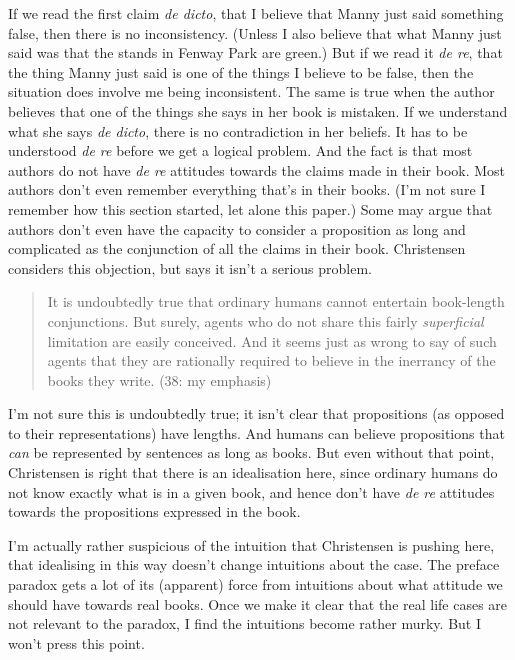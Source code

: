 \noindent If we read the first claim \textit{de dicto}, that I believe that Manny just said something false, then there is no inconsistency. (Unless I also believe that what Manny just said was that the stands in Fenway Park are green.) But if we read it \textit{de re}, that the thing Manny just said is one of the things I believe to be false, then the situation does involve me being inconsistent. The same is true when the author believes that one of the things she says in her book is mistaken. If we understand what she says \textit{de dicto}, there is no contradiction in her beliefs. It has to be understood \textit{de re} before we get a logical problem. And the fact is that most authors do not have \textit{de re} attitudes towards the claims made in their book. Most authors don't even remember everything that's in their books. (I'm not sure I remember how this section started, let alone this paper.) Some may argue that authors don't even have the capacity to consider a proposition as long and complicated as the conjunction of all the claims in their book. Christensen considers this objection, but says it isn't a serious problem.

\begin{quote}
It is undoubtedly true that ordinary humans cannot entertain book-length conjunctions. But surely, agents who do not share this fairly \textit{superficial} limitation are easily conceived. And it seems just as wrong to say of such agents that they are rationally required to believe in the inerrancy of the books they write. (38: my emphasis)
\end{quote}

\noindent I'm not sure this is undoubtedly true; it isn't clear that propositions (as opposed to their representations) have lengths. And humans can believe propositions that \textit{can} be represented by sentences as long as books. But even without that point, Christensen is right that there is an idealisation here, since ordinary humans do not know exactly what is in a given book, and hence don't have \textit{de re} attitudes towards the propositions expressed in the book.

I'm actually rather suspicious of the intuition that Christensen is pushing here, that idealising in this way doesn't change intuitions about the case. The preface paradox gets a lot of its (apparent) force from intuitions about what attitude we should have towards real books. Once we make it clear that the real life cases are not relevant to the paradox, I find the intuitions become rather murky. But I won't press this point. 

